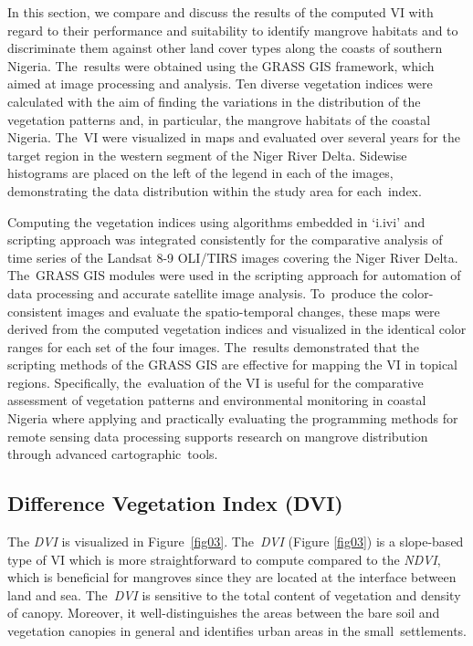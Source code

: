 \documentclass[jmse,article,accept,pdftex,moreauthors]{Definitions/mdpi}
\begin{document}
In this section, we compare and discuss the results of the computed VI with regard to their performance and suitability to identify mangrove habitats and to discriminate them against other land cover types along the coasts of southern Nigeria. The~results were obtained using the GRASS GIS framework, which aimed at image processing and analysis. Ten diverse vegetation indices were calculated with the aim of finding the variations in the distribution of the vegetation patterns and, in particular, the mangrove habitats of the coastal Nigeria. The~VI were visualized in maps and evaluated over several years for the target region in the western segment of the Niger River Delta. Sidewise histograms are placed on the left of the legend in each of the images, demonstrating the data distribution within the study area for each~index. 

Computing the vegetation indices using algorithms embedded in `i.ivi' and scripting approach was integrated consistently for the comparative analysis of time series of the Landsat 8-9 OLI/TIRS images covering the Niger River Delta. The~GRASS GIS modules were used in the scripting approach for automation of data processing and accurate satellite image analysis. To~produce the color-consistent images and evaluate the spatio-temporal changes, these maps were derived from the computed vegetation indices and visualized in the identical color ranges for each set of the four images. The~results demonstrated that the scripting methods of the GRASS GIS are effective for mapping the VI in topical regions. Specifically, the~evaluation of the VI is useful for the comparative assessment of vegetation patterns and environmental monitoring in coastal Nigeria where applying and practically evaluating the programming methods for remote sensing data processing supports research on mangrove distribution through advanced cartographic~tools. 

\subsection{Difference Vegetation Index (DVI)}

The \emph{DVI} is visualized in Figure~\ref{fig03}. The~\emph{DVI} (Figure \ref{fig03}) is a slope-based type of VI which is more straightforward to compute compared to the \emph{NDVI}, which is beneficial for mangroves since they are located at the interface between land and sea. The~\emph{DVI} is sensitive to the total content of vegetation and density of canopy. Moreover, it well-distinguishes the areas between the bare soil and vegetation canopies in general and identifies urban areas in the small~settlements.
\end{document}
